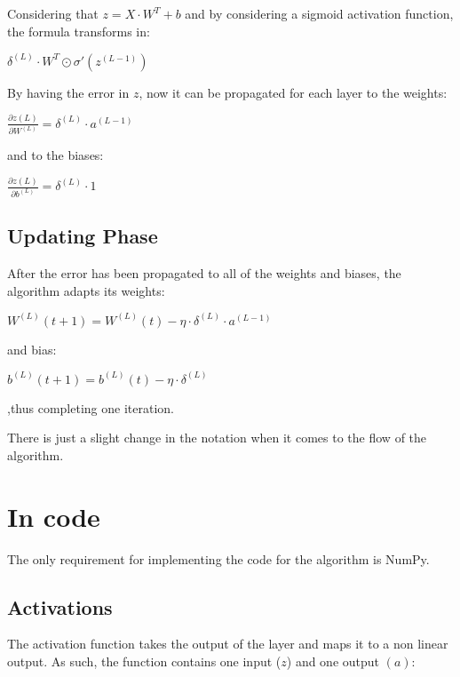 \documentclass{report}
\begin{document}
Considering that $z = X\cdot W^T +b$ and by considering a sigmoid activation function, the formula transforms in:

\begin{center}
$ \delta^{(L)} \cdot W^T \odot \sigma'(z^{(L-1)})$
\end{center}

By having the error in $z$, now it can be propagated for each layer to the weights:
\begin{center}
$ \frac{\partial z{(L)}}{\partial W^{(L)}} = \delta^{(L)}\cdot a^{(L-1)}$
\end{center}

and to the biases:

\begin{center}
$ \frac{\partial z{(L)}}{\partial b^{(L)}} = \delta^{(L)}\cdot 1$
\end{center}


\subsection{Updating Phase}

After the error has been propagated to all of the weights and biases, the algorithm adapts its weights:

\begin{center}
$ W^{(L)}(t+1) = W^{(L)}(t) - \eta \cdot \delta^{(L)}\cdot a^{(L-1)}$
\end{center}

and bias:

\begin{center}
$ b^{(L)}(t+1) = b^{(L)}(t) - \eta \cdot \delta^{(L)}$
\end{center}

,thus completing one iteration.

There is just a slight change in the notation when it comes to the flow of the algorithm.

\section{In code}

The only requirement for implementing the code for the algorithm is NumPy.


\subsection{Activations}
The activation function takes the output of the layer and maps it to a non linear output. As such, the function contains one input ($z$) and one output $(a)$:
\end{document}
